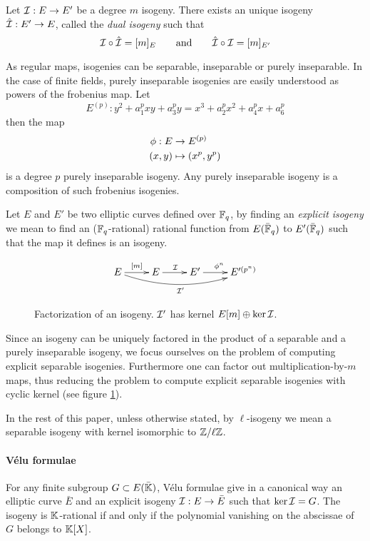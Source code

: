 \begin{definition}
  Let $\mathcal{I} : E \rightarrow E'$ be a degree $m$ isogeny. There exists an
  unique isogeny $\hat{\mathcal{I}} : E' \rightarrow E$, called the \emph{dual
    isogeny} such that
  \[\mathcal{I}\circ\hat{\mathcal{I}} = [m]_E \qquad\text{and}\qquad \hat{\mathcal{I}}\circ\mathcal{I} =
  [m]_{E'}\]
\end{definition}

As regular maps, isogenies can be separable, inseparable or purely
inseparable. In the case of finite fields, purely inseparable
isogenies are easily understood as powers of the frobenius map. Let
\[E^{(p)} : y^2 + a_1^pxy + a_3^py = x^3 + a_2^px^2 + a_4^px + a_6^p\]
then the map
\begin{align*}
  \phi : E &\rightarrow E^{(p)}\\
          (x,y) &\mapsto (x^p,y^p)
\end{align*}
is a degree $p$ purely inseparable isogeny. Any purely inseparable
isogeny is a composition of such frobenius isogenies.

Let $E$ and $E'$ be two elliptic curves defined over $\mathbb{F}_q$, by
finding an \emph{explicit isogeny} we mean to find an
($\mathbb{F}_q$-rational) rational function from $E(\bar{\mathbb{F}}_q)$ to
$E'(\bar{\mathbb{F}}_q)$ such that the map it defines is an isogeny.

\begin{figure}
  \centering
  \[\xymatrix{
    E \ar[r]^{[m]}\ar@/_1pc/[rrr]_{\I'} & E \ar[r]^\I & E' \ar[r]^{\frobisog^n} & E'^{(p^n)}\\
  }\]
  \label{fig:fact}
  \caption{Factorization of an isogeny. $\mathcal{I}'$ has kernel $E[m]\oplus\ker\mathcal{I}$.}
\end{figure}

Since an isogeny can be uniquely factored in the product of a
separable and a purely inseparable isogeny, we focus ourselves on the
problem of computing explicit separable isogenies. Furthermore one can
factor out multiplication-by-$m$ maps, thus reducing the problem to
compute explicit separable isogenies with cyclic kernel (see figure
\ref{fig:fact}).

In the rest of this paper, unless otherwise stated, by $\ell$-isogeny
we mean a separable isogeny with kernel isomorphic to $\mathbb{Z}/\ell\mathbb{Z}$.

\paragraph{Vélu formulae}
For any finite subgroup $G \subset E(\bar{\mathbb{K}})$, Vélu formulae
\cite{Vel71} give in a canonical way an elliptic curve $\bar{E}$ and
an explicit isogeny $\mathcal{I}:E\rightarrow \bar{E}$ such that
$\ker\mathcal{I}=G$. The isogeny is $\mathbb{K}$-rational if and only if the polynomial
vanishing on the abscissae of $G$ belongs to $\mathbb{K}[X]$.

